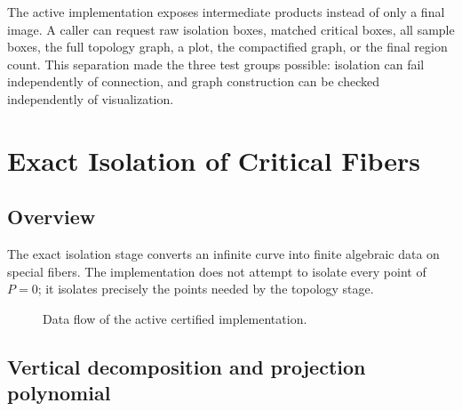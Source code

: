 \documentclass[11pt,a4paper]{article}
\newcommand{\QQ}{\mathbb{Q}}
\begin{document}
The active implementation exposes intermediate products instead of only a
final image. A caller can request raw isolation boxes, matched critical boxes,
all sample boxes, the full topology graph, a plot, the compactified graph, or
the final region count. This separation made the three test groups possible:
isolation can fail independently of connection, and graph construction can be
checked independently of visualization.


\section{Exact Isolation of Critical Fibers}

\subsection{Overview}

The exact isolation stage converts an infinite curve into finite algebraic
data on special fibers. The implementation does not attempt to isolate every
point of $P=0$; it isolates precisely the points needed by the topology stage.

\begin{figure}[htbp]
\centering
{}
\caption{Data flow of the active certified implementation.}
\label{fig:pipeline}
\end{figure}

\subsection{Vertical decomposition and projection polynomial}
\end{document}

